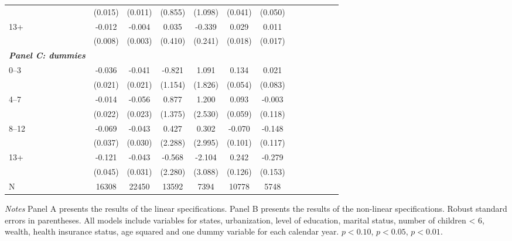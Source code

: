 \documentclass[10pt,letterpaper]{article}
\begin{document}
\begin{table}[p]
\begin{center}
\begin{adjustbox}{max width=\linewidth}
\begin{threeparttable}
{\begin{tabular}{l*{6}{S S}}
						&  (0.015)         &  (0.011)         &  (0.855)         &  (1.098)         &  (0.041)         &  (0.050)         \\
						13+   &    -0.012         &   -0.004         &    0.035         &   -0.339         &    0.029         &    0.011         \\
						&  (0.008)         &  (0.003)         &  (0.410)         &  (0.241)         &  (0.018)         &  (0.017)         \\
						\textit{\textbf{Panel C: dummies}} &&&&&&\\
						0--3&   -0.036\sym{*}  &   -0.041\sym{**} &   -0.821         &    1.091         &    0.134\sym{**} &    0.021         \\
						&  (0.021)         &  (0.021)         &  (1.154)         &  (1.826)         &  (0.054)         &  (0.083)         \\
						4--7&   -0.014         &   -0.056\sym{**} &    0.877         &    1.200         &    0.093         &   -0.003         \\
						&  (0.022)         &  (0.023)         &  (1.375)         &  (2.530)         &  (0.059)         &  (0.118)         \\
						8--12 &  -0.069\sym{*}  &   -0.043         &    0.427         &    0.302         &   -0.070         &   -0.148         \\
						&  (0.037)         &  (0.030)         &  (2.288)         &  (2.995)         &  (0.101)         &  (0.117)         \\
						13+ &   -0.121\sym{***}&   -0.043         &   -0.568         &   -2.104         &    0.242\sym{*}  &   -0.279\sym{*}  \\
						&  (0.045)         &  (0.031)         &  (2.280)         &  (3.088)         &  (0.126)         &  (0.153)         \\
						\midrule
						N         &    16308         &    22450         &    13592         &     7394         &    10778         &     5748         \\
						\bottomrule
					\end{tabular}
					\begin{tablenotes}
						\item \footnotesize \textit{Notes} Panel A presents the results of the linear specifications. Panel B presents the results of the non-linear specifications. Robust standard errors in parentheses. All models include variables for  states, urbanization, level of education, marital status, number of children < 6, wealth, health insurance status, age squared and one dummy variable for each calendar year. \sym{*} \(p<0.10\), \sym{**} \(p<0.05\), \sym{***} \(p<0.01\).
					\end{tablenotes}
				}
			\end{threeparttable}
		\end{adjustbox}
	\end{center}
\end{table}
\end{document}
